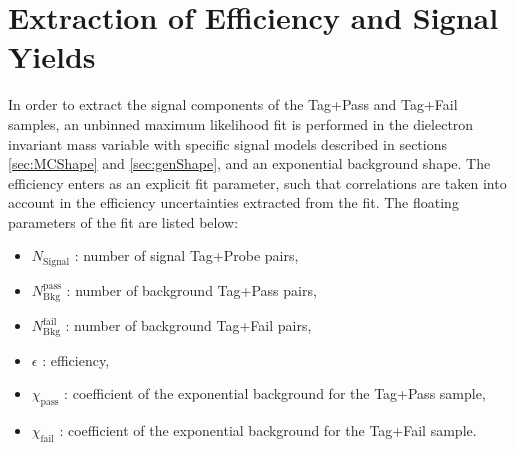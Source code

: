 \section{Extraction of Efficiency and Signal Yields}
In order to extract the signal components of the Tag+Pass and Tag+Fail samples, an unbinned 
maximum likelihood fit is performed in the dielectron
invariant mass variable with specific signal models described in sections \ref{sec:MCShape} 
and \ref{sec:genShape}, and an exponential background shape. The efficiency enters as an 
explicit fit parameter, such that correlations are taken into account in the efficiency 
uncertainties extracted from the fit. The floating parameters of the fit are listed below:
\begin{itemize}
\item $N_{\mathrm{Signal}}$ : number of signal Tag+Probe pairs,
\item $N^{\mathrm{pass}}_{\mathrm{Bkg}}$ : number of background Tag+Pass pairs,
\item $N^{\mathrm{fail}}_{\mathrm{Bkg}}$ : number of background Tag+Fail pairs,
\item $\epsilon$ : efficiency,
\item $\chi_{\mathrm{pass}}$ : coefficient of the exponential background for the Tag+Pass sample,
\item $\chi_{\mathrm{fail}}$ : coefficient of the exponential background for the Tag+Fail sample.
\end{itemize}

